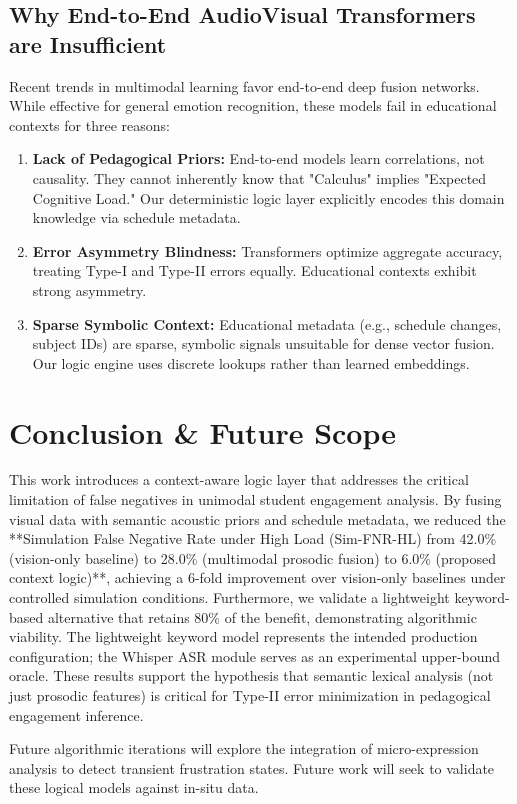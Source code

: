 \documentclass[conference]{IEEEtran}
\begin{document}
\subsection{Why End-to-End AudioVisual Transformers are Insufficient}
Recent trends in multimodal learning favor end-to-end deep fusion networks. While effective for general emotion recognition, these models fail in educational contexts for three reasons:
\begin{enumerate}
    \item \textbf{Lack of Pedagogical Priors:} End-to-end models learn correlations, not causality. They cannot inherently know that "Calculus" implies "Expected Cognitive Load." Our deterministic logic layer explicitly encodes this domain knowledge via schedule metadata.
    \item \textbf{Error Asymmetry Blindness:} Transformers optimize aggregate accuracy, treating Type-I and Type-II errors equally. Educational contexts exhibit strong asymmetry.
    \item \textbf{Sparse Symbolic Context:} Educational metadata (e.g., schedule changes, subject IDs) are sparse, symbolic signals unsuitable for dense vector fusion. Our logic engine uses discrete lookups rather than learned embeddings.
\end{enumerate}

\section{Conclusion \& Future Scope}
This work introduces a context-aware logic layer that addresses the critical limitation of false negatives in unimodal student engagement analysis. By fusing visual data with semantic acoustic priors and schedule metadata, we reduced the **Simulation False Negative Rate under High Load (Sim-FNR-HL) from 42.0\% (vision-only baseline) to 28.0\% (multimodal prosodic fusion) to 6.0\% (proposed context logic)**, achieving a 6-fold improvement over vision-only baselines under controlled simulation conditions. Furthermore, we validate a lightweight keyword-based alternative that retains 80\% of the benefit, demonstrating algorithmic viability. The lightweight keyword model represents the intended production configuration; the Whisper ASR module serves as an experimental upper-bound oracle. These results support the hypothesis that semantic lexical analysis (not just prosodic features) is critical for Type-II error minimization in pedagogical engagement inference.

Future algorithmic iterations will explore the integration of micro-expression analysis to detect transient frustration states. Future work will seek to validate these logical models against in-situ data.
\end{document}
